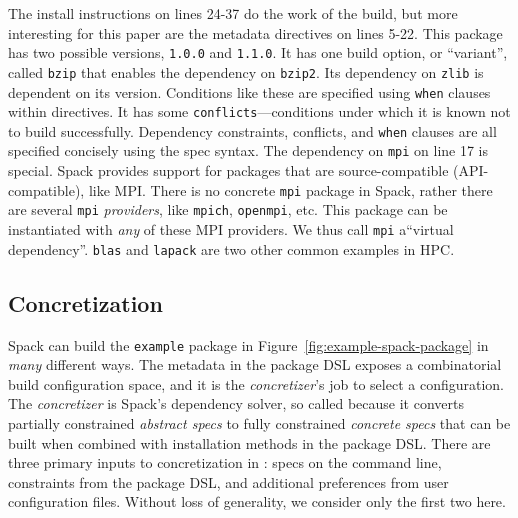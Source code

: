 The install instructions on lines 24-37 do the work of the build, but more interesting
for this paper are the metadata directives on lines 5-22. This package has two possible
versions, {\tt 1.0.0} and {\tt 1.1.0}. It has one build option, or ``variant'', called
{\tt bzip} that enables the dependency on {\tt bzip2}. Its dependency on {\tt zlib} is
dependent on its version. Conditions like these are specified using {\tt when} clauses
within directives. It has some {\tt conflicts}---conditions under which it is known not to build
successfully. Dependency constraints, conflicts, and {\tt when} clauses are all
specified concisely using the  spec syntax.
%
The dependency on {\tt mpi} on line 17 is special. Spack provides support for packages
that are source-compatible (API-compatible), like MPI. There is no concrete {\tt mpi}
package in Spack, rather there are several {\tt mpi} {\it providers}, like {\tt mpich},
{\tt openmpi}, etc. This package can be instantiated with {\it any} of these MPI
providers. We thus call {\tt mpi} a``virtual dependency''. {\tt blas} and {\tt lapack}
are two other common examples in HPC.

\subsection{Concretization}

Spack can build the {\tt example} package in Figure~\ref{fig:example-spack-package} in
{\it many} different ways. The metadata in the package DSL exposes a combinatorial build
configuration space, and it is the {\it concretizer}'s job to select a configuration.
The {\it concretizer} is Spack's dependency solver, so called because it converts
partially constrained \emph{abstract specs} to fully constrained \emph{concrete specs}
that can be built when combined with installation methods in the package DSL.
%
There are three primary inputs to concretization in \spack: specs on the command line,
constraints from the package DSL, and additional preferences from user configuration
files. Without loss of generality, we consider only the first two here.
%
%
%
